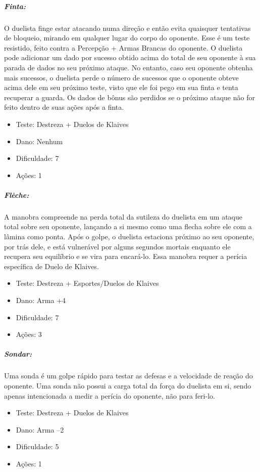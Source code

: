 \subparagraph{\bf Finta:} O duelista finge estar atacando numa direção e então evita quaisquer tentativas de bloqueio, mirando em qualquer lugar do corpo do oponente. Esse é um teste resistido, feito contra a Percepção + Armas Brancas do oponente. O duelista pode adicionar um dado por sucesso obtido acima do total de seu oponente à sua parada de dados no seu próximo ataque. No entanto, caso seu oponente obtenha mais sucessos, o duelista perde o número de sucessos que o oponente obteve acima dele em seu próximo teste, visto que ele foi pego em sua finta e tenta recuperar a guarda. Os dados de bônus são perdidos se o próximo ataque não for feito dentro de suas ações após a finta.
\begin{itemize}[noitemsep]
\item Teste: Destreza + Duelos de Klaives
\item Dano: Nenhum
\item Dificuldade: 7 
\item Ações: 1
\end{itemize}

\subparagraph{\bf Flèche:} A manobra compreende na perda total da sutileza do duelista em um ataque total sobre seu oponente, lançando a si mesmo como uma flecha sobre ele com a lâmina como ponta. Após o golpe, o duelista estaciona próximo ao seu oponente, por trás dele, e está vulnerável por alguns segundos mortais enquanto ele recupera seu equilíbrio e se vira para encará-lo. Essa manobra requer a perícia específica de Duelo de Klaives.
\begin{itemize}[noitemsep]
\item Teste: Destreza + Esportes/Duelos de Klaives
\item Dano: Arma +4
\item Dificuldade: 7 
\item Ações: 3
\end{itemize}

\subparagraph{\bf Sondar:} Uma sonda é um golpe rápido para testar as defesas e a velocidade de reação do oponente. Uma sonda não possui a carga total da força do duelista em si, sendo apenas intencionada a medir a perícia do oponente, não para feri-lo. 
\begin{itemize}[noitemsep]
\item Teste: Destreza + Duelos de Klaives
\item Dano: Arma –2
\item Dificuldade: 5 
\item Ações: 1
\end{itemize}
    
